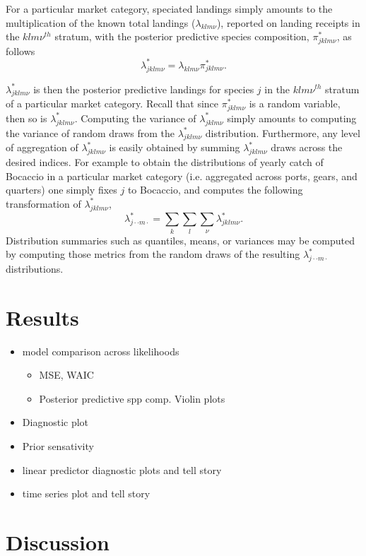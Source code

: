 \documentclass[12pt]{article}
\begin{document}
%
For a particular market category, speciated landings simply amounts to
the multiplication of the known total landings (\(\lambda_{klm\nu}\)),
reported on landing receipts in the \(klm\nu^{th}\) stratum, with the
posterior predictive species composition, \(\pi^*_{jklm\nu}\), as follows
%
\[\lambda^*_{jklm\nu} = \lambda_{klm\nu}\pi^*_{jklm\nu}.\]

%
$\lambda^*_{jklm\nu}$ is then the posterior predictive landings for
species \(j\) in the \(klm\nu^{th}\) stratum of a particular market
category. Recall that since \(\pi^*_{jklm\nu}\) is a random variable,
then so is \(\lambda^*_{jklm\nu}\). Computing the variance of
\(\lambda^*_{jklm\nu}\) simply amounts to computing the variance of
random draws from the \(\lambda^*_{jklm\nu}\) distribution.
Furthermore, any level of aggregation of \(\lambda^*_{jklm\nu}\) is
easily obtained by summing \(\lambda^*_{jklm\nu}\) draws across the
desired indices. For example to obtain the distributions of yearly catch
of Bocaccio in a particular market category (i.e. aggregated across ports, 
gears, and quarters) one simply fixes $j$ to Bocaccio, and computes the 
following transformation of \(\lambda^*_{jklm\nu}\),
%
\[\lambda^*_{j\cdot\cdot m\cdot} =\sum_{k}\sum_{l}\sum_{\nu}\lambda^*_{jklm\nu}.\]
%
Distribution summaries such as quantiles, means, or variances may be
computed by computing those metrics from the random draws of the
resulting \(\lambda^*_{j\cdot\cdot m\cdot}\) distributions.

%
%
\section{Results}\label{results}
%
%

%
\begin{itemize}
\item model comparison across likelihoods 
	\begin{itemize}
	\item MSE, WAIC
	\item Posterior predictive spp comp. Violin plots
	\end{itemize}
\item Diagnostic plot
\item Prior sensativity
\item linear predictor diagnostic plots and tell story
\item time series plot and tell story
\end{itemize}

%
%
\section{Discussion}\label{discussion}
%
%
\end{document}
